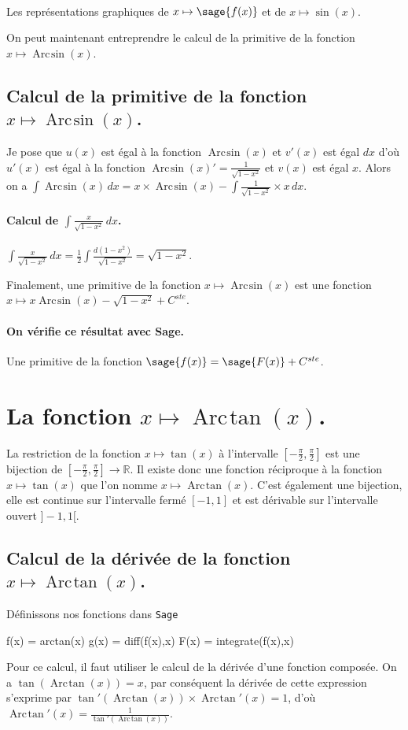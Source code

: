 \documentclass[a4paper,12pt]{report}
\def\eclaire{\mathbb}
\def\R{\ensuremath{\eclaire R}}
\renewcommand{\arcsin}{\mathop{\mathrm{Arc\mspace{2mu}sin}}}
\renewcommand{\arctan}{\mathop{\mathrm{Arc\mspace{2mu}tan}}}
\begin{document}
\begin{center}
\\
Les représentations graphiques de $x \mapsto \sage{f(x)} $ et de $x\mapsto \sin(x)$.
\end{center}
On peut maintenant entreprendre le calcul de la primitive de la  fonction  $x \mapsto \arcsin(x) $.

\subsection{Calcul de la primitive de la fonction  $x \mapsto \arcsin(x) $.}
Je pose que $u(x)$  est égal à la fonction $\arcsin(x)$ et $v'(x)$ est égal $dx$  d'où $u'(x)$  est égal à la fonction $\arcsin(x) ' = \frac{1}{\sqrt{1- x^2}} $ et $v(x)$ est égal $x$.
Alors on a $\int \arcsin(x) \, dx = x \times \arcsin(x) -\int \frac{1}{\sqrt{1- x^2}} \times x \, dx $.


\paragraph{Calcul de $\int \frac{x}{\sqrt{1- x^2}} \, dx $.}
$\int \frac{x}{\sqrt{1- x^2}} \, dx = \frac{1}{2} \int \frac{d(1-x^2)}{\sqrt{1- x^2}}= \sqrt{1- x^2} $.

Finalement, une primitive de la fonction $x \mapsto \arcsin(x) $ est une fonction  $ x \mapsto x \arcsin(x) - \sqrt{1- x^2} + C^{ste} $.
\paragraph{On vérifie ce résultat avec Sage.}
Une primitive de la fonction $\sage{f(x)} = \sage{F(x)} + C^{ste}$.


\section{La fonction  $x \mapsto \arctan(x) $.}
La restriction de la fonction $x \mapsto \tan(x) $ à l'intervalle $\left[-\frac{\pi}{2},\frac{\pi}{2}\right]$ est une bijection de $\left[-\frac{\pi}{2},\frac{\pi}{2}\right] \rightarrow \R $. Il existe donc une fonction réciproque à la fonction $x \mapsto \tan(x) $ que l'on nomme $x \mapsto \arctan(x) $. C'est également une bijection, elle est continue sur l'intervalle fermé  $ [-1,1]$ et est dérivable sur l'intervalle ouvert $]-1,1[$.


\subsection{Calcul de la dérivée de la fonction $x \mapsto \arctan(x) $.}
Définissons nos fonctions dans {\texttt{Sage}}
\begin{sageblock}
    f(x) = arctan(x)
    g(x) = diff(f(x),x)
    F(x) = integrate(f(x),x)
\end{sageblock}
Pour ce calcul, il faut utiliser le calcul de la dérivée d'une fonction composée. On a $\tan(\arctan(x))=x$, par conséquent la dérivée de cette expression s'exprime par $ \tan'(\arctan(x)) \times \arctan\nolimits'(x) = 1$, d'où $\arctan\nolimits'(x) = \frac{1}{\tan'(\arctan(x))} $.
\end{document}
